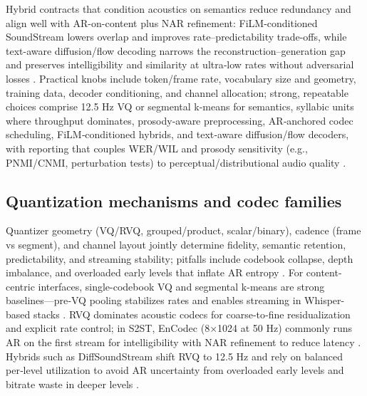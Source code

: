 Hybrid contracts that condition acoustics on semantics reduce redundancy and align well with AR-on-content plus NAR refinement: FiLM-conditioned SoundStream lowers overlap and improves rate–predictability trade-offs, while text-aware diffusion/flow decoding narrows the reconstruction–generation gap and preserves intelligibility and similarity at ultra‑low rates without adversarial losses \cite{yang2025diffsoundstreamefficientspeechtokenizati,peng2024mslms2stmultitaskspeechlanguagemodeltext,wang2025tadicodectextawarediffusionspeechtokeniz}. Practical knobs include token/frame rate, vocabulary size and geometry, training data, decoder conditioning, and channel allocation; strong, repeatable choices comprise 12.5 Hz VQ or segmental k-means for semantics, syllabic units where throughput dominates, prosody-aware preprocessing, AR‑anchored codec scheduling, FiLM‑conditioned hybrids, and text‑aware diffusion/flow decoders, with reporting that couples WER/WIL and prosody sensitivity (e.g., PNMI/CNMI, perturbation tests) to perceptual/distributional audio quality \cite{zeng2024scalingspeechtextpretrainingsyntheticint,kando2025exploringeffectsegmentationvocabularysiz,baade2024syllablelmlearningcoarsesemanticunitsspe,onda2025benchmarkingprosodyencodingdiscretespeec,li2024investigatingneuralaudiocodecsspeechlang,yang2025diffsoundstreamefficientspeechtokenizati,wang2025tadicodectextawarediffusionspeechtokeniz,guo2025recentadvancesdiscretespeechtokensreview}.

\subsection{Quantization mechanisms and codec families} \label{subsec:Quantization mechanisms and codec families}
Quantizer geometry (VQ/RVQ, grouped/product, scalar/binary), cadence (frame vs segment), and channel layout jointly determine fidelity, semantic retention, predictability, and streaming stability; pitfalls include codebook collapse, depth imbalance, and overloaded early levels that inflate AR entropy \cite{zeng2024scalingspeechtextpretrainingsyntheticint}. For content-centric interfaces, single-codebook VQ and segmental k-means are strong baselines—pre‑VQ pooling stabilizes rates and enables streaming in Whisper-based stacks \cite{baade2024syllablelmlearningcoarsesemanticunitsspe,zeng2024scalingspeechtextpretrainingsyntheticint}. RVQ dominates acoustic codecs for coarse‑to‑fine residualization and explicit rate control; in S2ST, EnCodec (8×1024 at 50 Hz) commonly runs AR on the first stream for intelligibility with NAR refinement to reduce latency \cite{peng2024mslms2stmultitaskspeechlanguagemodeltext}. Hybrids such as DiffSoundStream shift RVQ to 12.5 Hz and rely on balanced per‑level utilization to avoid AR uncertainty from overloaded early levels and bitrate waste in deeper levels \cite{yang2025diffsoundstreamefficientspeechtokenizati}.

